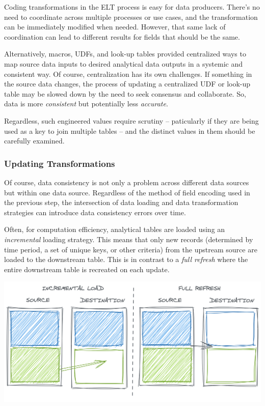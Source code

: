 \documentclass[
]{krantz}
\begin{document}
Coding transformations in the ELT process is easy for data producers. There's no need to coordinate across multiple processes or use cases, and the transformation can be immediately modified when needed. However, that same lack of coordination can lead to different results for fields that should be the same.

Alternatively, macros, UDFs, and look-up tables provided centralized ways to map source data inputs to desired analytical data outputs in a systemic and consistent way. Of course, centralization has its own challenges. If something in the source data changes, the process of updating a centralized UDF or look-up table may be slowed down by the need to seek consensus and collaborate. So, data is more \emph{consistent} but potentially less \emph{accurate}.

Regardless, such engineered values require scrutiny -- paticularly if they are being used as a key to join multiple tables -- and the distinct values in them should be carefully examined.

\hypertarget{updating-transformations-1}{%
\subsubsection{Updating Transformations}\label{updating-transformations-1}}

Of course, data consistency is not only a problem across different data sources but within one data source. Regardless of the method of field encoding used in the previous step, the intersection of data loading and data transformation strategies can introduce data consistency errors over time.

Often, for computation efficiency, analytical tables are loaded using an \emph{incremental} loading strategy. This means that only new records (determined by time period, a set of unique keys, or other criteria) from the upstream source are loaded to the downstream table. This is in contrast to a \emph{full refresh} where the entire downstream table is recreated on each update.

\begin{center}\includegraphics[width=0.9\linewidth]{figures/data-dall/incr-full-good} \end{center}
\end{document}
